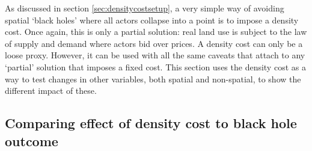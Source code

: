 
As discussed in section \ref{sec:densitycostsetup}, a very simple way of avoiding spatial `black holes' where all actors collapse into a point is to impose a density cost. Once again, this is only a partial solution: real land use is subject to the law of supply and demand where actors bid over prices. A density cost can only be a loose proxy. However, it can be used with all the same caveats that attach to any `partial' solution that imposes a fixed cost. This section uses the density cost as a way to test changes in other variables, both spatial and non-spatial, to show the different impact of these. 
 

\subsection{Comparing effect of density cost to black hole outcome \label{sec:densitycomp}}


